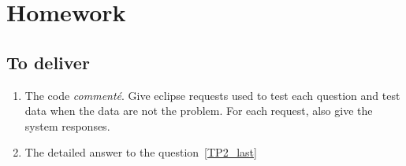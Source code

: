 % 
% 
% 

\section{Homework}

\subsection{To deliver}

\begin{enumerate}
\item The code \eclipse{} \emph{commenté}. Give eclipse requests
   used to test each question and test data when the data are not the problem.
   For each request, also give the system responses.
\item The detailed answer to the question~\ref{TP2_last} 
\end{enumerate}


